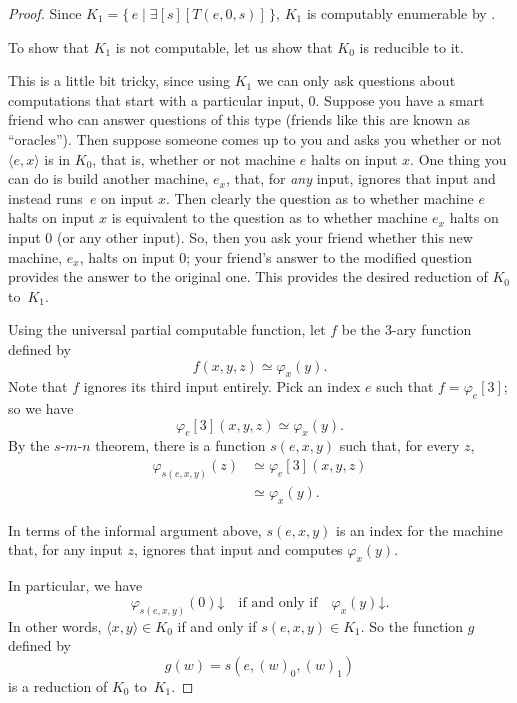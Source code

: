 \documentclass[10pt,a4paper]{article}
\makeatletter
\theoremstyle{plain}
\theoremstyle{definition}
\theoremstyle{remark}
\newenvironment{explain}{}{}
\newcommand{\olref}{\@ifnextchar[{\olref@i}{\olref@final}}
\def\olref@i[#1]{\@ifnextchar[{\olref@ii}{\olref@final}}
\def\olref@ii[#1]{\@ifnextchar[{\olref@iii}{\olref@final}}
\def\olref@iii[#1]{\olref@final}
\def\olref@final#1{\ref{#1}}
\providecommand{\lexists}{\mathord{\exists}}
\providecommand{\tuple}[1]{\langle #1 \rangle}
\providecommand{\cfind}[1]{\varphi_{#1}}
\providecommand{\fdefined}{\mathord{\downarrow}}
\providecommand{\Setabs}[2]{\{\, #1 \mid #2 \,\}}
\makeatother
\begin{document}
\begin{proof}
Since $K_1 = \Setabs{e}{\lexists[s][T(e,0,s)]}$, $K_1$ is computably
enumerable by \olref[eqc]{thm:exists-char}.

To show that $K_1$ is not computable, let us show that $K_0$ is
reducible to it.

\begin{explain}
This is a little bit tricky, since using $K_1$ we can
only ask questions about computations that start with a particular
input, $0$. Suppose you have a smart friend who can answer questions
of this type (friends like this are known as ``oracles''). Then
suppose someone comes up to you and asks you whether or not $\tuple{e,
  x}$ is in $K_0$, that is, whether or not machine $e$ halts on input
$x$. One thing you can do is build another machine, $e_x$, that, for
\emph{any} input, ignores that input and instead runs~$e$ on input
$x$. Then clearly the question as to whether machine $e$ halts on
input $x$ is equivalent to the question as to whether machine $e_x$
halts on input $0$ (or any other input). So, then you ask your friend
whether this new machine, $e_x$, halts on input $0$; your friend's
answer to the modified question provides the answer to the original
one. This provides the desired reduction of $K_0$ to~$K_1$.
\end{explain}

Using the universal partial computable function, let $f$
be the 3-ary function defined by
\[
f(x,y,z) \simeq \cfind{x}(y).
\]
Note that $f$ ignores its third input entirely. Pick an index $e$ such
that $f = \cfind{e}[3]$; so we have
\[
\cfind{e}[3](x,y,z) \simeq \cfind{x}(y).
\]
By the $s$-$m$-$n$ theorem, there is a function $s(e,x,y)$ such that, for
every $z$,
\begin{align*}
\cfind{s(e,x,y)}(z) & \simeq \cfind{e}[3](x,y,z) \\
& \simeq \cfind{x}(y).
\end{align*}

\begin{explain}
In terms of the informal argument above, $s(e,x,y)$ is an index for
the machine that, for any input $z$, ignores that input and computes
$\cfind{x}(y)$.
\end{explain}

In particular, we have
\[
\cfind{s(e,x,y)}(0) \fdefined \quad \text{if and only if} \quad
\cfind{x}(y) \fdefined.
\]
In other words, $\tuple{x, y} \in K_0$ if and only if $s(e,x,y) \in
K_1$. So the function $g$ defined by
\[
g(w) = s(e,(w)_0,(w)_1)
\]
is a reduction of $K_0$ to~$K_1$.
\end{proof}
\end{document}
